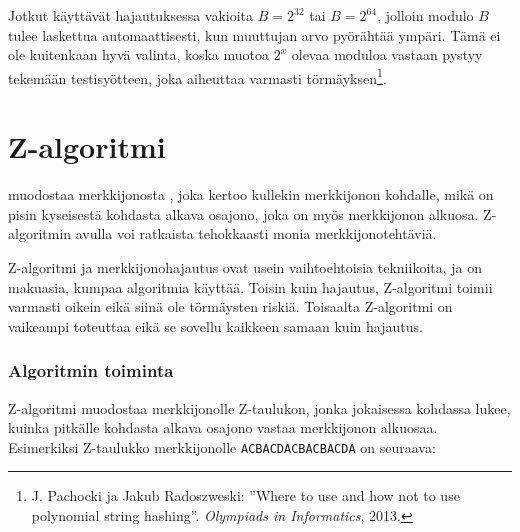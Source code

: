 Jotkut käyttävät hajautuksessa vakioita $B=2^{32}$ tai $B=2^{64}$,
jolloin modulo $B$ tulee laskettua
automaattisesti, kun muuttujan arvo pyörähtää ympäri.
Tämä ei ole kuitenkaan hyvä valinta,
koska muotoa $2^x$ olevaa moduloa vastaan
pystyy tekemään testisyötteen, joka aiheuttaa varmasti törmäyksen\footnote{
J. Pachocki ja Jakub Radoszweski:
''Where to use and how not to use polynomial string hashing''.
\textit{Olympiads in Informatics}, 2013.
}.

\section{Z-algoritmi}


 muodostaa merkkijonosta ,
joka kertoo kullekin merkkijonon kohdalle,
mikä on pisin kyseisestä kohdasta alkava osajono,
joka on myös merkkijonon alkuosa.
Z-algoritmin avulla voi ratkaista tehokkaasti
monia merkkijonotehtäviä.

Z-algoritmi ja merkkijonohajautus ovat usein
vaihtoehtoisia tekniikoita, ja on makuasia,
kumpaa algoritmia käyttää.
Toisin kuin hajautus, Z-algoritmi toimii
varmasti oikein eikä siinä ole törmäysten riskiä.
Toisaalta Z-algoritmi on vaikeampi toteuttaa eikä
se sovellu kaikkeen samaan kuin hajautus.

\subsubsection*{Algoritmin toiminta}

Z-algoritmi muodostaa merkkijonolle Z-taulukon,
jonka jokaisessa kohdassa lukee,
kuinka pitkälle kohdasta
alkava osajono vastaa merkkijonon alkuosaa.
Esimerkiksi Z-taulukko
merkkijonolle \texttt{ACBACDACBACBACDA} on seuraava:

